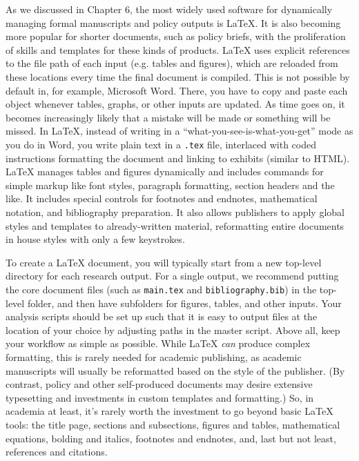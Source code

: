 As we discussed in Chapter 6, the most widely used software
for dynamically managing formal manuscripts and policy outputs is {\LaTeX}.
It is also becoming more popular for shorter documents,
such as policy briefs,
with the proliferation of skills and templates for these kinds of products.
\index{\LaTeX}
{\LaTeX} uses explicit references to the file path of each input (e.g. tables and figures),
which are reloaded from these locations every time the final document is compiled.
This is not possible by default in, for example, Microsoft Word.
There, you have to copy and paste each object
whenever tables, graphs, or other inputs are updated.
As time goes on, it becomes increasingly likely
that a mistake will be made or something will be missed.
In {\LaTeX}, instead of writing in a
``what-you-see-is-what-you-get'' mode as you do in Word,
you write plain text in a \texttt{.tex} file,
interlaced with coded instructions formatting the document and linking to exhibits (similar to HTML).
{\LaTeX} manages tables and figures dynamically
and includes commands for simple markup
like font styles, paragraph formatting, section headers and the like.
It includes special controls for
footnotes and endnotes, mathematical notation, and bibliography preparation.
It also allows publishers to apply global styles and templates to already-written material,
reformatting entire documents in house styles with only a few keystrokes.

To create a {\LaTeX} document,
you will typically start from a new top-level directory for each research output.
For a single output, we recommend putting the core document files
(such as \texttt{main.tex} and \texttt{bibliography.bib})
in the top-level folder,
and then have subfolders for figures, tables, and other inputs.
Your analysis scripts should be set up such that it is easy to output files
at the location of your choice by adjusting paths in the master script.
Above all, keep your workflow as simple as possible.
While {\LaTeX} \textit{can} produce complex formatting,
this is rarely needed for academic publishing,
as academic manuscripts will usually be reformatted
based on the style of the publisher.
(By contrast, policy and other self-produced documents may desire
extensive typesetting and investments in custom templates and formatting.)
So, in academia at least,
it's rarely worth the investment to go beyond basic {\LaTeX} tools:
the title page, sections and subsections,
figures and tables, mathematical equations,
bolding and italics, footnotes and endnotes,
and, last but not least, references and citations.

